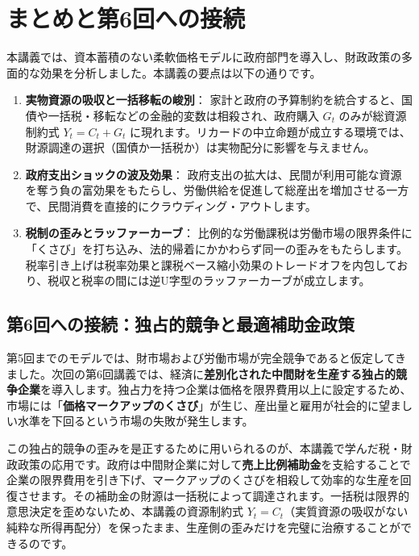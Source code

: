 \documentclass[
  japanese,
  lualatex,
  ja=standard,
  12pt,
  a4paper]{ltjsarticle}
\providecommand{\tightlist}{%
  \setlength{\itemsep}{0pt}\setlength{\parskip}{0pt}}
\begin{document}
\section{まとめと第6回への接続}\label{ux307eux3068ux3081ux3068ux7b2c6ux56deux3078ux306eux63a5ux7d9a}

本講義では、資本蓄積のない柔軟価格モデルに政府部門を導入し、財政政策の多面的な効果を分析しました。本講義の要点は以下の通りです。

\begin{enumerate}
\def\labelenumi{\arabic{enumi}.}
\tightlist
\item
  \textbf{実物資源の吸収と一括移転の峻別}：
  家計と政府の予算制約を統合すると、国債や一括税・移転などの金融的変数は相殺され、政府購入
  \(G_t\) のみが総資源制約式 \(Y_t = C_t + G_t\)
  に現れます。リカードの中立命題が成立する環境では、財源調達の選択（国債か一括税か）は実物配分に影響を与えません。
\item
  \textbf{政府支出ショックの波及効果}：
  政府支出の拡大は、民間が利用可能な資源を奪う負の富効果をもたらし、労働供給を促進して総産出を増加させる一方で、民間消費を直接的にクラウディング・アウトします。
\item
  \textbf{税制の歪みとラッファーカーブ}：
  比例的な労働課税は労働市場の限界条件に「くさび」を打ち込み、法的帰着にかかわらず同一の歪みをもたらします。税率引き上げは税率効果と課税ベース縮小効果のトレードオフを内包しており、税収と税率の間には逆U字型のラッファーカーブが成立します。
\end{enumerate}

\subsection{第6回への接続：独占的競争と最適補助金政策}\label{ux7b2c6ux56deux3078ux306eux63a5ux7d9aux72ecux5360ux7684ux7af6ux4e89ux3068ux6700ux9069ux88dcux52a9ux91d1ux653fux7b56}

第5回までのモデルでは、財市場および労働市場が完全競争であると仮定してきました。次回の第6回講義では、経済に\textbf{差別化された中間財を生産する独占的競争企業}を導入します。独占力を持つ企業は価格を限界費用以上に設定するため、市場には「\textbf{価格マークアップのくさび}」が生じ、産出量と雇用が社会的に望ましい水準を下回るという市場の失敗が発生します。

この独占的競争の歪みを是正するために用いられるのが、本講義で学んだ税・財政政策の応用です。政府は中間財企業に対して\textbf{売上比例補助金}を支給することで企業の限界費用を引き下げ、マークアップのくさびを相殺して効率的な生産を回復させます。その補助金の財源は一括税によって調達されます。一括税は限界的意思決定を歪めないため、本講義の資源制約式
\(Y_t = C_t\)（実質資源の吸収がない純粋な所得再配分）を保ったまま、生産側の歪みだけを完璧に治療することができるのです。
\end{document}
